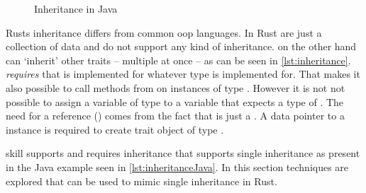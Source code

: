 \documentclass[thesis]{subfiles}
\begin{document}
  \begin{wrapfigure}{r}{0.38\textwidth}
    \vspace*{-1.825\baselineskip}%
    \captionsetup{type=lstlisting}
    \begin{center}
      \usebox{\inheritanceJava}
    \end{center}
    \vspace*{-\baselineskip}%
    \caption{Inheritance in Java}\label{lst:inheritanceJava}%
    \vspace*{-\baselineskip}%
  \end{wrapfigure}
  Rusts inheritance differs from common \gls{oop} languages.
  In Rust \structs are just a collection of data and do not support any kind of inheritance.
  \traits  on the other hand can `inherit' other traits -- multiple at once -- as can be seen in \autoref{lst:inheritance}.
   \emph{requires} that  is implemented for whatever type  is implemented for.
  That makes it also possible to call methods from  on instances of type .
  However it is not not possible to assign a variable of type  to a variable that expects a type of .
  The need for a reference (\codr{&}) comes from the fact that  is just a \trait.
  A data pointer to a \struct instance is required to create trait object of type .

  \gls{skill} supports and requires inheritance that supports single inheritance\autocite{skill-tr} as present in the Java example seen in \autoref{lst:inheritanceJava}.
  In this section techniques are explored that can be used to mimic single inheritance in Rust.

  \newsavebox{\inheritanceOne}
  \begin{lrbox}{\inheritanceOne}%
    \begin{minipage}{.445\linewidth}
      
    \end{minipage}
  \end{lrbox}

  \newsavebox{\inheritanceTwo}
  \begin{lrbox}{\inheritanceTwo}
    \begin{minipage}{.4825\linewidth}
      
    \end{minipage}
  \end{lrbox}
\end{document}

